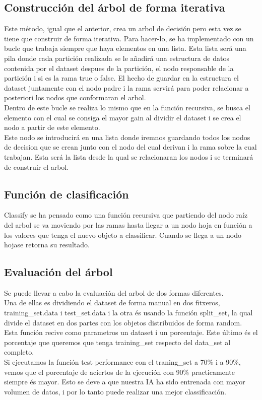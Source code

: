 \documentclass{article}
\begin{document}
\subsection{Construcción del árbol de forma iterativa}
%
Este método, igual que el anterior, crea un arbol de decisión pero
esta vez se tiene que construir de forma iterativa. Para hacer-lo, se
ha implementado con un bucle que trabaja siempre que haya elementos en 
una lista. Esta lista será una pila donde cada partición realizada
se le añadirá una estructura de datos contenida por el dataset despues
de la partición, el nodo responsable de la partición i si es la rama
true o false. El hecho de guardar en la estructura el dataset juntamente con 
el nodo padre i la rama servirá para poder relacionar a posteriori los nodos
que conformaran el arbol.\\
Dentro de este bucle se realiza lo mismo que en la función recursiva, se busca
el elemento con el cual se consiga el mayor gain al dividir el dataset i
se crea el nodo a partir de este elemento.\\
Este nodo se introducirá en una lista donde iremnos guardando todos los 
nodos de decision que se crean junto con el nodo del cual derivan 
i la rama sobre la cual trabajan. Esta será la lista desde la qual se 
relacionaran los nodos i se terminará de construir el arbol.
\subsection{Función de clasificación}
%
Classify se ha pensado como una función recursiva que partiendo del nodo raíz
del arbol se va moviendo por las ramas hasta llegar a un nodo hoja en función
a los valores que tenga el nuevo objeto a classificar. Cuando se llega a un nodo 
hojase retorna su resultado.
\subsection{Evaluación del árbol}
%
Se puede llevar a cabo la evaluación del arbol de dos formas diferentes.\\ 
Una de ellas es dividiendo el dataset de forma manual en dos fitxeros, 
training\_set.data i test\_set.data i la otra és usando la función split\_set, 
la qual divide el dataset en dos partes con los objetos distribuidos de forma 
random. Esta función recive como parametros un dataset i un porcentaje. Este 
último és el porcentaje que queremos que tenga training\_set respecto del data\_set 
al completo.\\
Si ejecutamos la función test performance con el traning\_set a 70\% i a 90\%, 
vemos que el porcentaje de aciertos de la ejecución con 90\% practicamente siempre 
és mayor. Esto se deve a que nuestra IA ha sido entrenada con mayor volumen de datos, 
i por lo tanto puede realizar una mejor classificación.
\end{document}
